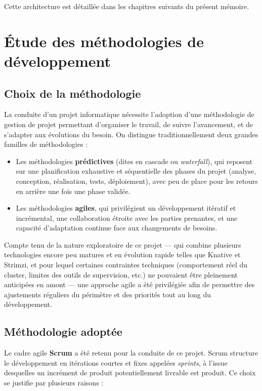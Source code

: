 Cette architecture est détaillée dans les chapitres suivants du présent mémoire.


\section{Étude des méthodologies de développement}

\subsection{Choix de la méthodologie}

La conduite d'un projet informatique nécessite l'adoption d'une méthodologie de gestion de projet permettant d'organiser le travail, de suivre l'avancement, et de s'adapter aux évolutions du besoin. On distingue traditionnellement deux grandes familles de méthodologies :

\begin{itemize}
    \item Les méthodologies \textbf{prédictives} (dites en cascade ou \textit{waterfall}), qui reposent sur une planification exhaustive et séquentielle des phases du projet (analyse, conception, réalisation, tests, déploiement), avec peu de place pour les retours en arrière une fois une phase validée.
    \item Les méthodologies \textbf{agiles}, qui privilégient un développement itératif et incrémental, une collaboration étroite avec les parties prenantes, et une capacité d'adaptation continue face aux changements de besoins.
\end{itemize}

Compte tenu de la nature exploratoire de ce projet — qui combine plusieurs technologies encore peu matures et en évolution rapide telles que Knative et Strimzi, et pour lequel certaines contraintes techniques (comportement réel du cluster, limites des outils de supervision, etc.) ne pouvaient être pleinement anticipées en amont — une approche agile a été privilégiée afin de permettre des ajustements réguliers du périmètre et des priorités tout au long du développement.

\subsection{Méthodologie adoptée}

Le cadre agile \textbf{Scrum} a été retenu pour la conduite de ce projet. Scrum structure le développement en itérations courtes et fixes appelées \textit{sprints}, à l'issue desquelles un incrément de produit potentiellement livrable est produit. Ce choix se justifie par plusieurs raisons :

